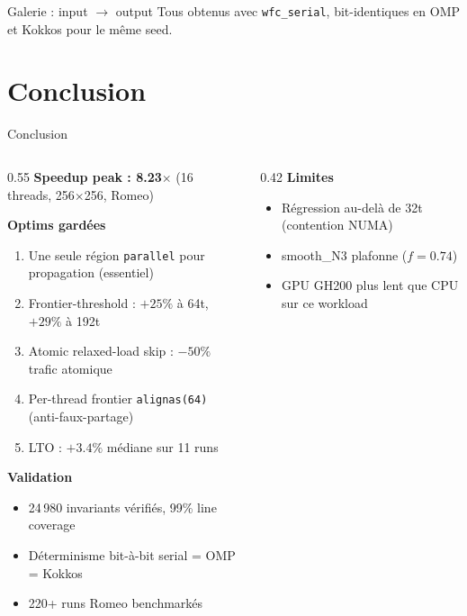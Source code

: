 \documentclass[aspectratio=169,11pt]{beamer}
\begin{document}
\begin{frame}{Galerie : input $\to$ output}
\vspace{0.15cm}
{\footnotesize Tous obtenus avec \texttt{wfc\_serial}, bit-identiques en OMP et Kokkos pour le même seed.}
\end{frame}

\section{Conclusion}

\begin{frame}{Conclusion}
\begin{columns}[T]
\begin{column}{0.55\textwidth}
\textbf{Speedup peak : 8.23$\times$} (16 threads, 256$\times$256, Romeo)

\vspace{0.3cm}
\textbf{Optims gardées}
\begin{enumerate}
\footnotesize
    \item Une seule région \texttt{parallel} pour propagation (essentiel)
    \item Frontier-threshold : $+25\%$ à 64t, $+29\%$ à 192t
    \item Atomic relaxed-load skip : $-50\%$ trafic atomique
    \item Per-thread frontier \texttt{alignas(64)} (anti-faux-partage)
    \item LTO : $+3.4\%$ médiane sur 11 runs
\end{enumerate}

\vspace{0.3cm}
\textbf{Validation}
\begin{itemize}
\footnotesize
    \item 24\,980 invariants vérifiés, 99\% line coverage
    \item Déterminisme bit-à-bit serial = OMP = Kokkos
    \item 220+ runs Romeo benchmarkés
\end{itemize}
\end{column}
\begin{column}{0.42\textwidth}
\textbf{Limites}
\begin{itemize}
\footnotesize
    \item Régression au-delà de 32t (contention NUMA)
    \item smooth\_N3 plafonne ($f = 0.74$)
    \item GPU GH200 plus lent que CPU sur ce workload
\end{itemize}


\end{column}
\end{columns}
\end{frame}
\end{document}
